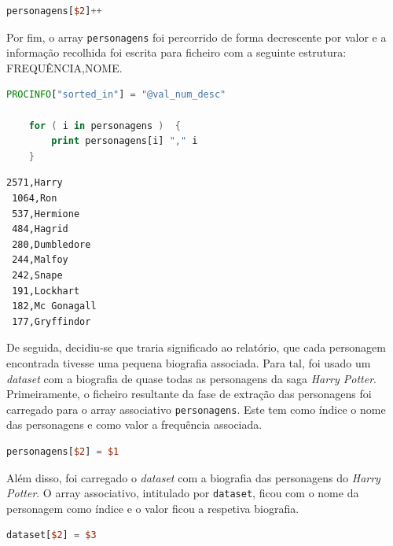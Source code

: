 \documentclass[a4paper]{article}
\begin{document}
\begin{lstlisting}[language=Awk, caption=extract\_pers.awk]
	personagens[$2]++
\end{lstlisting}

Por fim, o array \texttt{personagens} foi percorrido de forma decrescente por valor e a informação recolhida foi escrita para ficheiro com a seguinte estrutura: FREQUÊNCIA,NOME.

\begin{lstlisting}[language=Awk, caption=extract\_pers.awk]
	PROCINFO["sorted_in"] = "@val_num_desc"

	for ( i in personagens )  {
		print personagens[i] "," i
	}
\end{lstlisting}

\begin{lstlisting}[caption=Excerto do resultado da extração das personagens.]
 2571,Harry
 1064,Ron
 537,Hermione
 484,Hagrid
 280,Dumbledore
 244,Malfoy
 242,Snape
 191,Lockhart
 182,Mc Gonagall
 177,Gryffindor
\end{lstlisting}

De seguida, decidiu-se que traria significado ao relatório, que cada personagem encontrada tivesse uma pequena biografia associada. Para tal, foi usado um \textit{dataset} \cite{dataset} com a biografia de quase todas as personagens da saga \textit{Harry Potter}. Primeiramente, o ficheiro resultante da fase de extração das personagens foi carregado para o array associativo \texttt{personagens}. Este tem como índice o nome das personagens e como valor a frequência associada.

\begin{lstlisting}[language=Awk, caption=add\_bio.awk]
	personagens[$2] = $1
\end{lstlisting}

Além disso, foi carregado o \textit{dataset} com a biografia das personagens do \textit{Harry Potter}. O array associativo, intitulado por \texttt{dataset}, ficou com o nome da personagem como índice e o valor ficou a respetiva biografia. 

\begin{lstlisting}[language=Awk, caption=add\_bio.awk]
	dataset[$2] = $3
\end{lstlisting}
\end{document}
